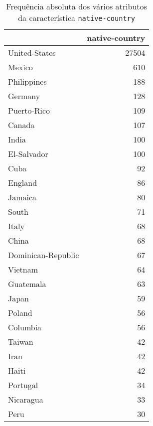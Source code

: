 \begin{table}
\centering
\caption{Frequência absoluta dos vários atributos da característica \texttt{native-country}}
\begin{tabular}{lr}
\toprule
{} &  native-country \\
\midrule
 United-States              &           27504 \\
 Mexico                     &             610 \\
 Philippines                &             188 \\
 Germany                    &             128 \\
 Puerto-Rico                &             109 \\
 Canada                     &             107 \\
 India                      &             100 \\
 El-Salvador                &             100 \\
 Cuba                       &              92 \\
 England                    &              86 \\
 Jamaica                    &              80 \\
 South                      &              71 \\
 Italy                      &              68 \\
 China                      &              68 \\
 Dominican-Republic         &              67 \\
 Vietnam                    &              64 \\
 Guatemala                  &              63 \\
 Japan                      &              59 \\
 Poland                     &              56 \\
 Columbia                   &              56 \\
 Taiwan                     &              42 \\
 Iran                       &              42 \\
 Haiti                      &              42 \\
 Portugal                   &              34 \\
 Nicaragua                  &              33 \\
 Peru                       &              30 \\

\end{tabular}
\end{table}
